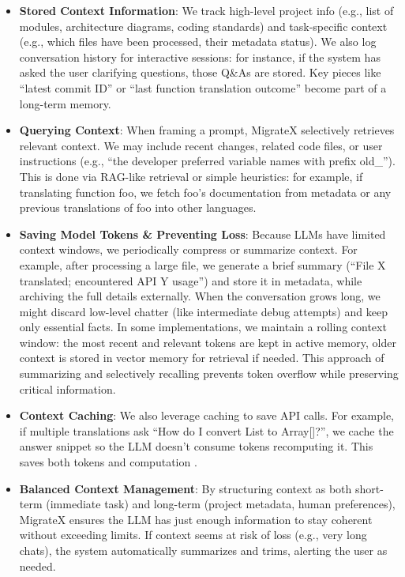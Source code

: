 \documentclass[twocolumn]{article}
\begin{document}
\begin{itemize}
    \item \textbf{Stored Context Information}: We track high-level project info (e.g., list of modules, architecture diagrams, coding standards) and task-specific context (e.g., which files have been processed, their metadata status). We also log conversation history for interactive sessions: for instance, if the system has asked the user clarifying questions, those Q\&As are stored. Key pieces like ``latest commit ID'' or ``last function translation outcome'' become part of a long-term memory.

    \item \textbf{Querying Context}: When framing a prompt, MigrateX selectively retrieves relevant context. We may include recent changes, related code files, or user instructions (e.g., ``the developer preferred variable names with prefix old\_''). This is done via RAG-like retrieval or simple heuristics: for example, if translating function foo, we fetch foo’s documentation from metadata or any previous translations of foo into other languages.

    \item \textbf{Saving Model Tokens \& Preventing Loss}: Because LLMs have limited context windows, we periodically compress or summarize context. For example, after processing a large file, we generate a brief summary (``File X translated; encountered API Y usage'') and store it in metadata, while archiving the full details externally. When the conversation grows long, we might discard low-level chatter (like intermediate debug attempts) and keep only essential facts. In some implementations, we maintain a rolling context window: the most recent and relevant tokens are kept in active memory, older context is stored in vector memory for retrieval if needed. This approach of summarizing and selectively recalling prevents token overflow while preserving critical information.

    \item \textbf{Context Caching}: We also leverage caching to save API calls. For example, if multiple translations ask ``How do I convert List to Array[]?'', we cache the answer snippet so the LLM doesn’t consume tokens recomputing it. This saves both tokens and computation \cite{openai-prompt-caching}.

    \item \textbf{Balanced Context Management}: By structuring context as both short-term (immediate task) and long-term (project metadata, human preferences), MigrateX ensures the LLM has just enough information to stay coherent without exceeding limits. If context seems at risk of loss (e.g., very long chats), the system automatically summarizes and trims, alerting the user as needed.
\end{itemize}
\end{document}
